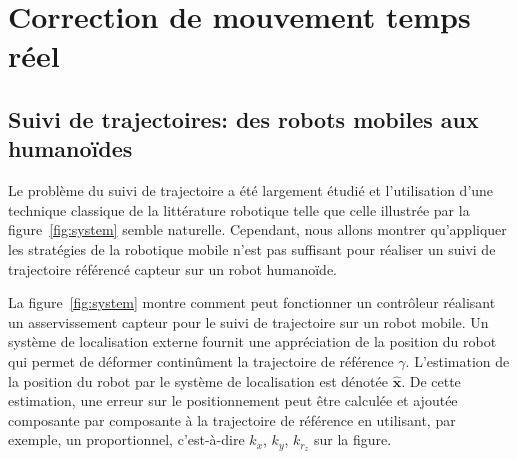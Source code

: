 \section{Correction de mouvement temps réel}
\subsection{Suivi de trajectoires: des robots mobiles aux humanoïdes}


Le problème du suivi de trajectoire a été largement étudié et
l'utilisation d'une technique classique de la littérature robotique
telle que celle illustrée par la figure \ref{fig:system} semble
naturelle. Cependant, nous allons montrer qu'appliquer les stratégies de
la robotique mobile n'est pas suffisant pour réaliser un suivi de
trajectoire référencé capteur sur un robot humanoïde.


La figure \ref{fig:system} montre comment peut fonctionner un
contrôleur réalisant un asservissement capteur pour le suivi de
trajectoire sur un robot mobile. Un système de localisation externe
fournit une appréciation de la position du robot qui permet de
déformer continûment la trajectoire de référence
$\gamma$. L'estimation de la position du robot par le système de
localisation est dénotée $\hat{\mathbf{x}}$. De cette estimation, une
erreur sur le positionnement peut être calculée et ajoutée composante
par composante à la trajectoire de référence en utilisant, par
exemple, un proportionnel, c'est-à-dire $k_x$, $k_y$, $k_{r_z}$ sur la
figure.


